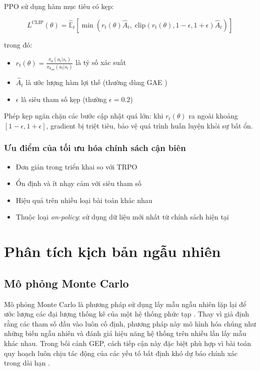 PPO sử dụng hàm mục tiêu có kẹp:

\begin{equation}
    L^{\text{CLIP}}(\theta) = \hat{\mathbb{E}}_t \left[ \min\left( r_t(\theta) \hat{A}_t,\; \text{clip}\left(r_t(\theta), 1-\epsilon, 1+\epsilon\right) \hat{A}_t \right) \right]
    \label{eq:ppo_clip}
\end{equation}

\noindent trong đó:
\begin{itemize}
    \item $r_t(\theta) = \frac{\pi_\theta(a_t | s_t)}{\pi_{\theta_{\text{old}}}(a_t | s_t)}$ là tỷ số xác suất
    \item $\hat{A}_t$ là ước lượng hàm lợi thế (thường dùng GAE \cite{schulman2015gae})
    \item $\epsilon$ là siêu tham số kẹp (thường $\epsilon = 0.2$)
\end{itemize}

Phép kẹp ngăn chặn các bước cập nhật quá lớn: khi $r_t(\theta)$ ra ngoài khoảng $[1-\epsilon, 1+\epsilon]$, gradient bị triệt tiêu, bảo vệ quá trình huấn luyện khỏi sự bất ổn.

\subsubsection{Ưu điểm của tối ưu hóa chính sách cận biên}
\begin{itemize}
    \item Đơn giản trong triển khai so với TRPO
    \item Ổn định và ít nhạy cảm với siêu tham số
    \item Hiệu quả trên nhiều loại bài toán khác nhau
    \item Thuộc loại \textit{on-policy}: sử dụng dữ liệu mới nhất từ chính sách hiện tại
\end{itemize}

\section{Phân tích kịch bản ngẫu nhiên}

\subsection{Mô phỏng Monte Carlo}

Mô phỏng Monte Carlo là phương pháp sử dụng lấy mẫu ngẫu nhiên lặp lại để ước lượng các đại lượng thống kê của một hệ thống phức tạp \cite{rubinstein2016monte_carlo}. Thay vì giả định rằng các tham số đầu vào luôn cố định, phương pháp này mô hình hóa chúng như những biến ngẫu nhiên và đánh giá hiệu năng hệ thống trên nhiều lần lấy mẫu khác nhau. Trong bối cảnh GEP, cách tiếp cận này đặc biệt phù hợp vì bài toán quy hoạch luôn chịu tác động của các yếu tố bất định khó dự báo chính xác trong dài hạn \cite{koltsaklis2018gep,oree2017gep_review}.

